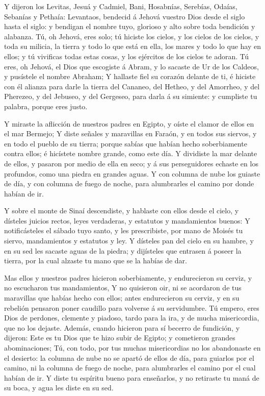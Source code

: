  Y dijeron los Levitas, Jesuá y Cadmiel, Bani, Hosabnías,
Serebías, Odaías, Sebanías y Pethaía: Levantaos, bendecid á Jehová
vuestro Dios desde el siglo hasta el siglo: y bendigan el nombre tuyo,
glorioso y alto sobre toda bendición y alabanza.  Tú, oh
Jehová, eres solo; tú hiciste los cielos, y los cielos de los cielos, y
toda su milicia, la tierra y todo lo que está en ella, los mares y todo
lo que hay en ellos; y tú vivificas todas estas cosas, y los ejércitos
de los cielos te adoran.  Tú eres, oh Jehová, el Dios que
escogiste á Abram, y lo sacaste de Ur de los Caldeos, y pusístele el
nombre Abraham;  Y hallaste fiel su corazón delante de ti,
é hiciste con él alianza para darle la tierra del Cananeo, del Hetheo, y
del Amorrheo, y del Pherezeo, y del Jebuseo, y del Gergeseo, para darla
á su simiente: y cumpliste tu palabra, porque eres justo.

 Y miraste la aflicción de nuestros padres en Egipto, y
oíste el clamor de ellos en el mar Bermejo;  Y diste
señales y maravillas en Faraón, y en todos sus siervos, y en todo el
pueblo de su tierra; porque sabías que habían hecho soberbiamente contra
ellos; é hicístete nombre grande, como este día.  Y
dividiste la mar delante de ellos, y pasaron por medio de ella en seco;
y á sus perseguidores echaste en los profundos, como una piedra en
grandes aguas.  Y con columna de nube los guiaste de día,
y con columna de fuego de noche, para alumbrarles el camino por donde
habían de ir.

 Y sobre el monte de Sinaí descendiste, y hablaste con
ellos desde el cielo, y dísteles juicios rectos, leyes verdaderas, y
estatutos y mandamientos buenos:  Y notificásteles el
sábado tuyo santo, y les prescribiste, por mano de Moisés tu siervo,
mandamientos y estatutos y ley.  Y dísteles pan del cielo
en su hambre, y en su sed les sacaste aguas de la piedra; y dijísteles
que entrasen á poseer la tierra, por la cual alzaste tu mano que se la
habías de dar.

 Mas ellos y nuestros padres hicieron soberbiamente, y
endurecieron su cerviz, y no escucharon tus mandamientos,
 Y no quisieron oir, ni se acordaron de tus maravillas
que habías hecho con ellos; antes endurecieron su cerviz, y en su
rebelión pensaron poner caudillo para volverse á su servidumbre. Tú
empero, eres Dios de perdones, clemente y piadoso, tardo para la ira, y
de mucha misericordia, que no los dejaste.  Además,
cuando hicieron para sí becerro de fundición, y dijeron: Este es tu Dios
que te hizo subir de Egipto; y cometieron grandes abominaciones;
 Tú, con todo, por tus muchas misericordias no los
abandonaste en el desierto: la columna de nube no se apartó de ellos de
día, para guiarlos por el camino, ni la columna de fuego de noche, para
alumbrarles el camino por el cual habían de ir.  Y diste
tu espíritu bueno para enseñarlos, y no retiraste tu maná de su boca, y
agua les diste en su sed.

